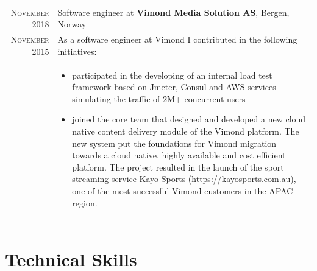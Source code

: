 \documentclass[a4paper,10pt]{article} %
\begin{document}
\begin{longtable}{r|p{11cm}}
\textsc{November} 2018 & Software engineer at \textbf{Vimond Media Solution AS}, Bergen, Norway
\\ \textsc{November} 2015 & \textsc As a software engineer at Vimond I contributed in the following initiatives: \\ &
\begin{itemize}
\item participated in the developing of an internal load test framework based on Jmeter, Consul and AWS services simulating the traffic of 2M+ concurrent users
\item joined the core team that designed and developed a new cloud native content delivery module of the Vimond platform. The new system put the foundations for Vimond migration towards a cloud native, highly available and cost efficient platform. The project resulted in the launch of the sport streaming service Kayo Sports (https://kayosports.com.au), one of the most successful Vimond customers in the APAC region.
\end{itemize} \\
\multicolumn{2}{c}{} \\




\end{longtable}


\section{Technical Skills}
\end{document}
